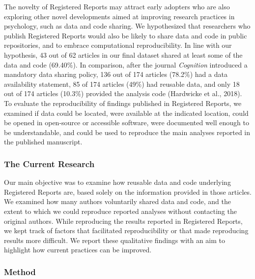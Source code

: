 \documentclass[,jou, a4paper,floatsintext]{apa6}
\begin{document}
The novelty of Registered Reports may attract early adopters who are also exploring other novel developments aimed at improving research practices in psychology, such as data and code sharing. We hypothesized that researchers who publish Registered Reports would also be likely to share data and code in public repositories, and to embrace computational reproducibility. In line with our hypothesis, 43 out of 62 articles in our final dataset shared at least some of the data and code (69.40\%). In comparison, after the journal \emph{Cognition} introduced a mandatory data sharing policy, 136 out of 174 articles (78.2\%) had a data availability statement, 85 of 174 articles (49\%) had reusable data, and only 18 out of 174 articles (10.3\%) provided the analysis code (Hardwicke et al., 2018). To evaluate the reproducibility of findings published in Registered Reports, we examined if data could be located, were available at the indicated location, could be opened in open-source or accessible software, were documented well enough to be understandable, and could be used to reproduce the main analyses reported in the published manuscript.

\hypertarget{the-current-research}{%
\subsubsection{The Current Research}\label{the-current-research}}

Our main objective was to examine how reusable data and code underlying Registered Reports are, based solely on the information provided in those articles. We examined how many authors voluntarily shared data and code, and the extent to which we could reproduce reported analyses without contacting the original authors. While reproducing the results reported in Registered Reports, we kept track of factors that facilitated reproducibility or that made reproducing results more difficult. We report these qualitative findings with an aim to highlight how current practices can be improved.

\hypertarget{method}{%
\subsubsection{Method}\label{method}}
\end{document}
